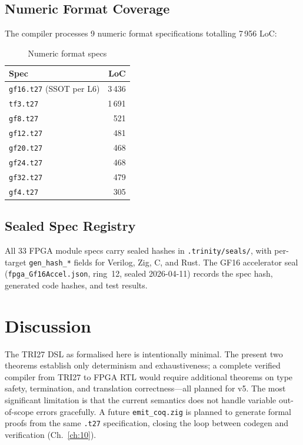 \subsection{Numeric Format Coverage}

The compiler processes 9 numeric format specifications totalling 7\,956 LoC:

\begin{table}[h]
\centering
\caption{Numeric format specs}
\begin{tabular}{lr}
\toprule
\textbf{Spec} & \textbf{LoC} \\
\midrule
\texttt{gf16.t27} (SSOT per L6) & 3\,436 \\
\texttt{tf3.t27}                 & 1\,691 \\
\texttt{gf8.t27}                 & 521 \\
\texttt{gf12.t27}                & 481 \\
\texttt{gf20.t27}                & 468 \\
\texttt{gf24.t27}                & 468 \\
\texttt{gf32.t27}                & 479 \\
\texttt{gf4.t27}                 & 305 \\
\bottomrule
\end{tabular}
\end{table}

\subsection{Sealed Spec Registry}

All 33 FPGA module specs carry sealed hashes in \texttt{.trinity/seals/}, with per-target \texttt{gen\_hash\_*} fields for Verilog, Zig, C, and Rust. The GF16 accelerator seal (\texttt{fpga\_Gf16Accel.json}, ring~12, sealed 2026-04-11) records the spec hash, generated code hashes, and test results.

\section{Discussion}

The TRI27 DSL as formalised here is intentionally minimal. The present two theorems establish only determinism and exhaustiveness; a complete verified compiler from TRI27 to FPGA RTL would require additional theorems on type safety, termination, and translation correctness---all planned for v5. The most significant limitation is that the current semantics does not handle variable out-of-scope errors gracefully. A future \texttt{emit\_coq.zig} is planned to generate formal proofs from the same \texttt{.t27} specification, closing the loop between codegen and verification (Ch.~\ref{ch:10}).
